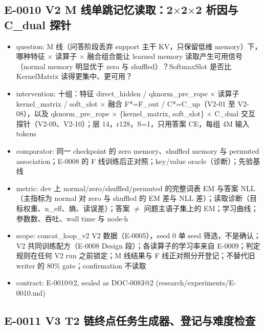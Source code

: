 \documentclass[11pt]{article}
\begin{document}
\subsection*{E-0010 V2 M 线单跳记忆读取：2\ensuremath{\times}2\ensuremath{\times}2 析因与 C\_dual 探针}

\begin{itemize}
\item question: M 线（问答阶段丢弃 support 主干 KV，只保留低维 memory）下，哪种特征 \ensuremath{\times} 读算子 \ensuremath{\times} 融合组合能让 learned memory 读取产生可用信号（normal memory 明显优于 zero 与 shuffled）？SoftmaxSlot 是否比 KernelMatrix 读得更集中、更可用？
\item intervention: 十组：特征 direct\_hidden / qknorm\_pre\_rope \ensuremath{\times} 读算子 kernel\_matrix / soft\_slot \ensuremath{\times} 融合 F*=F\_out / C*=C\_up（V2-01 至 V2-08），以及 qknorm\_pre\_rope \ensuremath{\times} \{kernel\_matrix, soft\_slot\} \ensuremath{\times} C\_dual 交互探针（V2-09、V2-10）；层 14，r128，S=1，只用答案 CE，每组 4M 输入 tokens
\item comparator: 同一 checkpoint 的 zero memory、shuffled memory 与 permuted association；E-0008 的 F 线训练后正对照；key/value oracle（诊断）；先验基线
\item metric: dev 上 normal/zero/shuffled/permuted 的完整词表 EM 与答案 NLL（主指标为 normal 对 zero 与 shuffled 的 EM 差与 NLL 差）；读取诊断（目标权重、n\_eff、熵、读误差）；答案 \ensuremath{\neq} 问题主语子集上的 EM；学习曲线；参数数、吞吐、wall time 与 node\ensuremath{\cdot}h
\item scope: concat\_loop\_v2 V2 数据（E-0005），seed 0 单 seed 筛选，不是确认；V2 共同训练配方（E-0008 Design 段）；各读算子的学习率来自 E-0009；判定规则在任何 V2 run 之前锁定；M 线结果与 F 线正对照分开登记；不替代旧 writer 的 80\% gate；confirmation 不读取
\item contract: E-0010@2, sealed as DOC-0083@2 (research/experiments/E-0010.md)
\end{itemize}

\subsection*{E-0011 V3 T2 链终点任务生成器、登记与难度检查}
\end{document}
